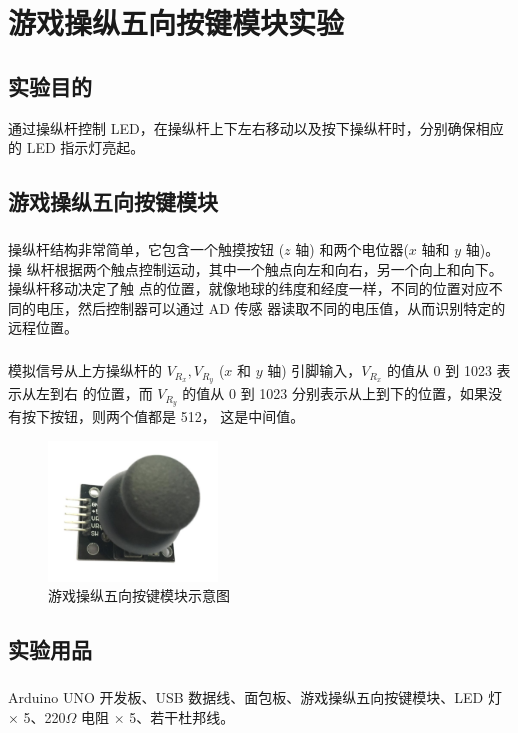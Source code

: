 \documentclass[UTF8, oneside]{ctexbook}
\begin{document}
\chapter{游戏操纵五向按键模块实验}
\section{实验目的}
通过操纵杆控制 LED，在操纵杆上下左右移动以及按下操纵杆时，分别确保相应
的 LED 指示灯亮起。

\section{游戏操纵五向按键模块}
\paragraph{}
操纵杆结构非常简单，它包含一个触摸按钮 ($z$ 轴) 和两个电位器($x$ 轴和 $y$ 轴)。操
纵杆根据两个触点控制运动，其中一个触点向左和向右，另一个向上和向下。操纵杆移动决定了触
点的位置，就像地球的纬度和经度一样，不同的位置对应不同的电压，然后控制器可以通过 AD 传感
器读取不同的电压值，从而识别特定的远程位置。

\paragraph{}
模拟信号从上方操纵杆的 $V_{R_x},V_{R_y}$ ($x$ 和 $y$ 轴) 引脚输入，$V_{R_x}$ 的值从 0 到 1023 表示从左到右
的位置，而 $V_{R_y}$ 的值从 0 到 1023 分别表示从上到下的位置，如果没有按下按钮，则两个值都是 512，
这是中间值。

\begin{figure}[h]
    \centering
    \includegraphics[width=0.4\textwidth]{./result/sensor/4/sensor.png}
    \caption{游戏操纵五向按键模块示意图}
    \label{4_sensor}
\end{figure}

\section{实验用品}
\paragraph{}
Arduino UNO 开发板、USB 数据线、面包板、游戏操纵五向按键模块、LED 灯 $\times$ 5、220$\Omega$ 电阻 $\times$ 5、若干杜邦线。
\end{document}

